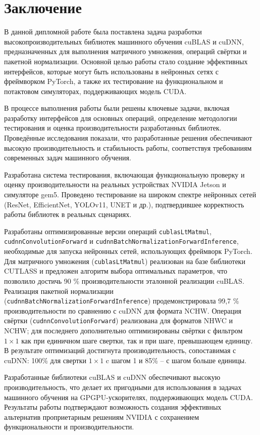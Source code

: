 \section{Заключение}
В данной дипломной работе была поставлена задача разработки высокопроизводительных библиотек машинного обучения cuBLAS и cuDNN,
предназначенных для выполнения матричного умножения, операций свёртки и пакетной нормализации. Основной целью работы стало создание
эффективных интерфейсов, которые могут быть использованы в нейронных сетях с фреймворком PyTorch, а также их тестирование на функциональном
и потактовом симуляторах, поддерживающих модель CUDA.

В процессе выполнения работы были решены ключевые задачи, включая разработку интерфейсов для основных операций, определение методологии тестирования
и оценка производительности разработанных библиотек. Проведённые исследования показали, что разработанные решения обеспечивают высокую производительность
и стабильность работы, соответствуя требованиям современных задач машинного обучения.

Разработана система тестирования, включающая функциональную проверку и оценку производительности на реальных устройствах NVIDIA Jetson и симуляторе gem5.
Проведено тестирование на широком спектре нейронных сетей (ResNet, EfficientNet, YOLOv11, UNET и др.), подтвердившее корректность работы библиотек в
реальных сценариях.

Разработаны оптимизированные версии операций \texttt{cublasLtMatmul}, \texttt{cudnnConvolutio\-nForward} и \texttt{cudnnBatchNormalizationForwardInference},
необходимые для запуска нейронных сетей, использующих фреймворк PyTorch. Для матричного умножения (\texttt{cublasL\-tMatmul}) реализован на базе библиотеки CUTLASS
и предложен алгоритм выбора оптимальных параметров, что позволило достичь 90 \% производительности эталонной реализации cuBLAS. Реализация пакетной нормализации
(\texttt{cudnnBatchNormalizationForwa\-rdInference}) продемонстрировала 99,7 \% производительности по сравнению с cuDNN для формата NCHW.
Операция свёртки (\texttt{cudnnConvolutionForward}) реализована для форматов NHWC и NCHW; для последнего дополнительно оптимизированы свёртки
с фильтром $1\times1$ как при единичном шаге свертки, так и при шаге, превышающем единицу. В результате оптимизаций достигнута производительность,
сопоставимая с cuDNN: 100\% для свертки $1\times1$ c шагом 1 и 85\% -- с шагом больше единицы.

Разработанные библиотеки cuBLAS и cuDNN обеспечивают высокую производительность, что делает их пригодными для использования в задачах машинного обучения на
GPGPU-ускорителях, поддерживающих модель CUDA. Результаты работы подтверждают возможность создания эффективных альтернатив проприетарным решениям NVIDIA с
сохранением функциональности и производительности.

